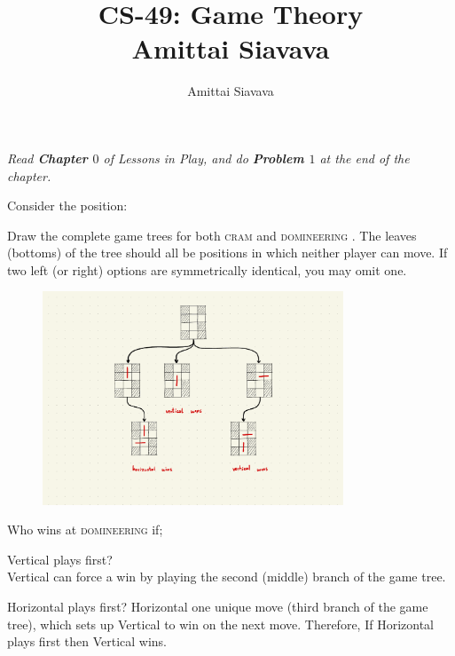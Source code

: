 \documentclass[11pt, reqno]{amsart}
\begin{document}

\title{CS-49: Game Theory\\ Amittai Siavava \\ }
\author{Amittai Siavava}


\setlength{\headheight}{13.0pt}
\setlength{\footskip}{15.0pt}

\maketitle

\def \cram { \textsc{cram} }
\def \dom { \textsc{domineering} }

\begin{problem}[5]
  \emph{Read \textbf{Chapter $0$} of Lessons in Play, and do \textbf{Problem $1$} at the end of the chapter.}

  \step
  Consider the position:

  \begin{enumalph}
    \item Draw the complete game trees for both \cram
      and \dom. The leaves (bottoms) of the tree
      should all be positions in which neither player can move.
      If two left (or right) options are symmetrically identical, you may omit one.

      \begin{figure}[H]
        
        \includegraphics[width=0.8\textwidth]{game-graph.pdf}
      \end{figure}

    \item Who wins at \dom if;
      \begin{enumroman}
        \item Vertical plays first? \\
          Vertical can force a win by playing
          the second (middle) branch of the game tree.
        \item Horizontal plays first?
          Horizontal one unique move (third branch of the game tree),
          which sets up Vertical to win on the next move.
          Therefore, If Horizontal plays first then Vertical wins.
      \end{enumroman}
      

\end{enumalph}
\end{problem}
\end{document}
